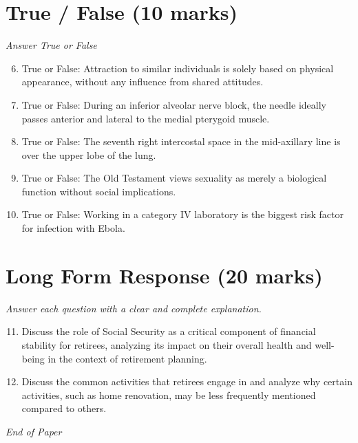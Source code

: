 \documentclass[12pt]{article}
\begin{document}
\section*{True / False (10 marks)}
\textit{Answer True or False}
\begin{enumerate}[label=\arabic*.]
\setcounter{enumi}{5}
\item True or False: Attraction to similar individuals is solely based on physical appearance, without any influence from shared attitudes.
\item True or False: During an inferior alveolar nerve block, the needle ideally passes anterior and lateral to the medial pterygoid muscle.
\item True or False: The seventh right intercostal space in the mid-axillary line is over the upper lobe of the lung.
\item True or False: The Old Testament views sexuality as merely a biological function without social implications.
\item True or False: Working in a category IV laboratory is the biggest risk factor for infection with Ebola.
\end{enumerate}

\section*{Long Form Response (20 marks)}
\textit{Answer each question with a clear and complete explanation.}
\begin{enumerate}[label=\arabic*.]
\setcounter{enumi}{10}
\item Discuss the role of Social Security as a critical component of financial stability for retirees, analyzing its impact on their overall health and well-being in the context of retirement planning.
\item Discuss the common activities that retirees engage in and analyze why certain activities, such as home renovation, may be less frequently mentioned compared to others.
\end{enumerate}

\vfill
\noindent\textit{End of Paper}
\end{document}
